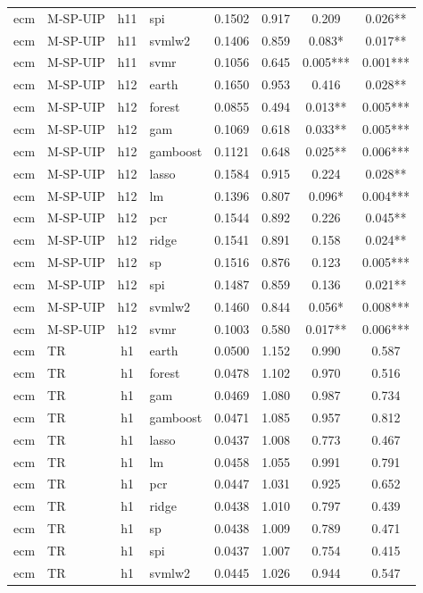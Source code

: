 \begin{ThreePartTable}
\begin{longtable}[t]{llclcccc}
ecm & M-SP-UIP & h11 & spi & 0.1502 & 0.917 & 0.209 & 0.026**\\
ecm & M-SP-UIP & h11 & svmlw2 & 0.1406 & 0.859 & 0.083* & 0.017**\\
ecm & M-SP-UIP & h11 & svmr & 0.1056 & 0.645 & 0.005*** & 0.001***\\
\addlinespace
ecm & M-SP-UIP & h12 & earth & 0.1650 & 0.953 & 0.416 & 0.028**\\
ecm & M-SP-UIP & h12 & forest & 0.0855 & 0.494 & 0.013** & 0.005***\\
ecm & M-SP-UIP & h12 & gam & 0.1069 & 0.618 & 0.033** & 0.005***\\
ecm & M-SP-UIP & h12 & gamboost & 0.1121 & 0.648 & 0.025** & 0.006***\\
ecm & M-SP-UIP & h12 & lasso & 0.1584 & 0.915 & 0.224 & 0.028**\\
ecm & M-SP-UIP & h12 & lm & 0.1396 & 0.807 & 0.096* & 0.004***\\
ecm & M-SP-UIP & h12 & pcr & 0.1544 & 0.892 & 0.226 & 0.045**\\
ecm & M-SP-UIP & h12 & ridge & 0.1541 & 0.891 & 0.158 & 0.024**\\
ecm & M-SP-UIP & h12 & sp & 0.1516 & 0.876 & 0.123 & 0.005***\\
ecm & M-SP-UIP & h12 & spi & 0.1487 & 0.859 & 0.136 & 0.021**\\
ecm & M-SP-UIP & h12 & svmlw2 & 0.1460 & 0.844 & 0.056* & 0.008***\\
ecm & M-SP-UIP & h12 & svmr & 0.1003 & 0.580 & 0.017** & 0.006***\\
\addlinespace
ecm & TR & h1 & earth & 0.0500 & 1.152 & 0.990 & 0.587\\
ecm & TR & h1 & forest & 0.0478 & 1.102 & 0.970 & 0.516\\
ecm & TR & h1 & gam & 0.0469 & 1.080 & 0.987 & 0.734\\
ecm & TR & h1 & gamboost & 0.0471 & 1.085 & 0.957 & 0.812\\
ecm & TR & h1 & lasso & 0.0437 & 1.008 & 0.773 & 0.467\\
ecm & TR & h1 & lm & 0.0458 & 1.055 & 0.991 & 0.791\\
ecm & TR & h1 & pcr & 0.0447 & 1.031 & 0.925 & 0.652\\
ecm & TR & h1 & ridge & 0.0438 & 1.010 & 0.797 & 0.439\\
ecm & TR & h1 & sp & 0.0438 & 1.009 & 0.789 & 0.471\\
ecm & TR & h1 & spi & 0.0437 & 1.007 & 0.754 & 0.415\\
ecm & TR & h1 & svmlw2 & 0.0445 & 1.026 & 0.944 & 0.547\\

\end{longtable}
\end{ThreePartTable}
